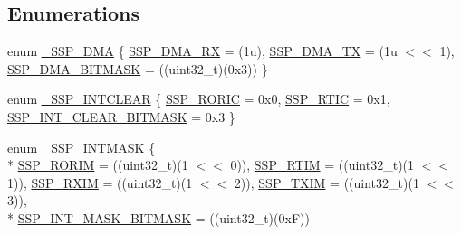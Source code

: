 \subsection*{Enumerations}
\begin{DoxyCompactItemize}
\item 
enum \hyperlink{group__SSP__17XX__40XX_gaee679ef8477b8e31bf174e66e2984caf}{\+\_\+\+S\+S\+P\+\_\+\+D\+MA} \{ \hyperlink{group__SSP__17XX__40XX_ggaee679ef8477b8e31bf174e66e2984cafae51f79e5713056c61aadb8d5ddfc335a}{S\+S\+P\+\_\+\+D\+M\+A\+\_\+\+RX} = (1u), 
\hyperlink{group__SSP__17XX__40XX_ggaee679ef8477b8e31bf174e66e2984cafa5925a5061635b0742605b6bb4b434ce4}{S\+S\+P\+\_\+\+D\+M\+A\+\_\+\+TX} = (1u $<$$<$ 1), 
\hyperlink{group__SSP__17XX__40XX_ggaee679ef8477b8e31bf174e66e2984cafa8e393687f85f713df0927a4c6f45679e}{S\+S\+P\+\_\+\+D\+M\+A\+\_\+\+B\+I\+T\+M\+A\+SK} = ((uint32\+\_\+t)(0x3))
 \}
\item 
enum \hyperlink{group__SSP__17XX__40XX_ga59cc14c5381f32c16286c45bd6a3ece0}{\+\_\+\+S\+S\+P\+\_\+\+I\+N\+T\+C\+L\+E\+AR} \{ \hyperlink{group__SSP__17XX__40XX_gga59cc14c5381f32c16286c45bd6a3ece0a3f8b48b9a600a7c3d1615c88abf76981}{S\+S\+P\+\_\+\+R\+O\+R\+IC} = 0x0, 
\hyperlink{group__SSP__17XX__40XX_gga59cc14c5381f32c16286c45bd6a3ece0a5c9358a05d7509ce431770ca872cdce0}{S\+S\+P\+\_\+\+R\+T\+IC} = 0x1, 
\hyperlink{group__SSP__17XX__40XX_gga59cc14c5381f32c16286c45bd6a3ece0acf79b0a911e1c9d4cee5387be0dc45ba}{S\+S\+P\+\_\+\+I\+N\+T\+\_\+\+C\+L\+E\+A\+R\+\_\+\+B\+I\+T\+M\+A\+SK} = 0x3
 \}
\item 
enum \hyperlink{group__SSP__17XX__40XX_gab6a0ac593093184dd21c95f53b30f4ef}{\+\_\+\+S\+S\+P\+\_\+\+I\+N\+T\+M\+A\+SK} \{ \\*
\hyperlink{group__SSP__17XX__40XX_ggab6a0ac593093184dd21c95f53b30f4efa891bf6d7622b4f6f010396f08a51adbf}{S\+S\+P\+\_\+\+R\+O\+R\+IM} = ((uint32\+\_\+t)(1 $<$$<$ 0)), 
\hyperlink{group__SSP__17XX__40XX_ggab6a0ac593093184dd21c95f53b30f4efaabb6398ce8ef5db95fc47fc2bd525f13}{S\+S\+P\+\_\+\+R\+T\+IM} = ((uint32\+\_\+t)(1 $<$$<$ 1)), 
\hyperlink{group__SSP__17XX__40XX_ggab6a0ac593093184dd21c95f53b30f4efa2fff5a42799aae53c7a4bf3e3a900448}{S\+S\+P\+\_\+\+R\+X\+IM} = ((uint32\+\_\+t)(1 $<$$<$ 2)), 
\hyperlink{group__SSP__17XX__40XX_ggab6a0ac593093184dd21c95f53b30f4efa34e61a5c1d77d3763e4f8e1bfacbdcc4}{S\+S\+P\+\_\+\+T\+X\+IM} = ((uint32\+\_\+t)(1 $<$$<$ 3)), 
\\*
\hyperlink{group__SSP__17XX__40XX_ggab6a0ac593093184dd21c95f53b30f4efa46081a07592bbc197435bbb21cc1e201}{S\+S\+P\+\_\+\+I\+N\+T\+\_\+\+M\+A\+S\+K\+\_\+\+B\+I\+T\+M\+A\+SK} = ((uint32\+\_\+t)(0xF))
$$
\end{DoxyCompactItemize}
